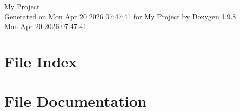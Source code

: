 \documentclass[twoside]{book}
\newcommand{\+}{\discretionary{\mbox{\scriptsize$\hookleftarrow$}}{}{}}
\newcommand{\clearemptydoublepage}{%
    \newpage{\pagestyle{empty}\cleardoublepage}%
  }
\begin{document}
  \raggedbottom
    \hypersetup{pageanchor=false,
                bookmarksnumbered=true,
                pdfencoding=unicode
               }
  \begin{titlepage}
  \vspace*{7cm}
  \begin{center}%
  {\Large My Project}\\
  \vspace*{1cm}
  {\large Generated on Mon Apr 20 2026 07\+:47\+:41 for My Project by Doxygen 1.9.8}\\
    \vspace*{0.5cm}
    {\small Mon Apr 20 2026 07:47:41}
  \end{center}
  \end{titlepage}
  \clearemptydoublepage
  \tableofcontents
  \clearemptydoublepage
  \hypersetup{pageanchor=true}

\chapter{File Index}

\chapter{File Documentation}


  \backmatter
  \newpage
  \clearemptydoublepage
  \printindex
\end{document}
